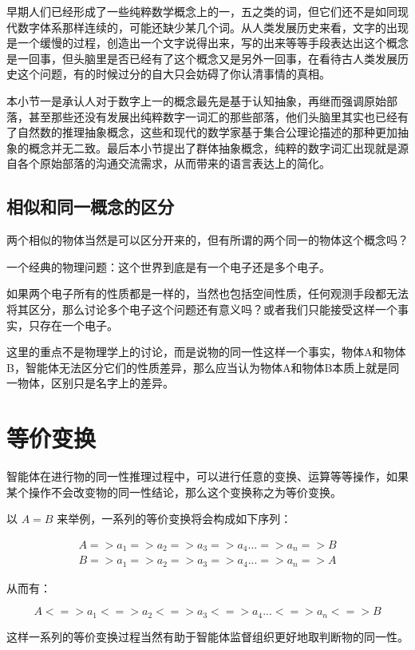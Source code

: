 \documentclass[12pt,oneside]{book}
\begin{document}
早期人们已经形成了一些纯粹数学概念上的一，五之类的词，但它们还不是如同现代数字体系那样连续的，可能还缺少某几个词。从人类发展历史来看，文字的出现是一个缓慢的过程，创造出一个文字说得出来，写的出来等等手段表达出这个概念是一回事，但头脑里是否已经有了这个概念又是另外一回事，在看待古人类发展历史这个问题，有的时候过分的自大只会妨碍了你认清事情的真相。

本小节一是承认人对于数字上一的概念最先是基于认知抽象，再继而强调原始部落，甚至那些还没有发展出纯粹数字一词汇的那些部落，他们头脑里其实也已经有了自然数的推理抽象概念，这些和现代的数学家基于集合公理论描述的那种更加抽象的概念并无二致。最后本小节提出了群体抽象概念，纯粹的数字词汇出现就是源自各个原始部落的沟通交流需求，从而带来的语言表达上的简化。



\section{相似和同一概念的区分}
两个相似的物体当然是可以区分开来的，但有所谓的两个同一的物体这个概念吗？

一个经典的物理问题：这个世界到底是有一个电子还是多个电子。

如果两个电子所有的性质都是一样的，当然也包括空间性质，任何观测手段都无法将其区分，那么讨论多个电子这个问题还有意义吗？或者我们只能接受这样一个事实，只存在一个电子。

这里的重点不是物理学上的讨论，而是说物的同一性这样一个事实，物体A和物体B，智能体无法区分它们的性质差异，那么应当认为物体A和物体B本质上就是同一物体，区别只是名字上的差异。




\chapter{等价变换}
智能体在进行物的同一性推理过程中，可以进行任意的变换、运算等等操作，如果某个操作不会改变物的同一性结论，那么这个变换称之为等价变换。

以 $A=B$ 来举例，一系列的等价变换将会构成如下序列：

\begin{align*}
A => a_1 => a_2 => a_3 => a_4 ... => a_n => B \\
B => a_1 => a_2 => a_3 => a_4 ... => a_n => A
\end{align*}

从而有：

\[
A <=> a_1 <=> a_2 <=> a_3 <=> a_4 ... <=> a_n <=> B 
\]

这样一系列的等价变换过程当然有助于智能体监督组织更好地取判断物的同一性。
\end{document}
